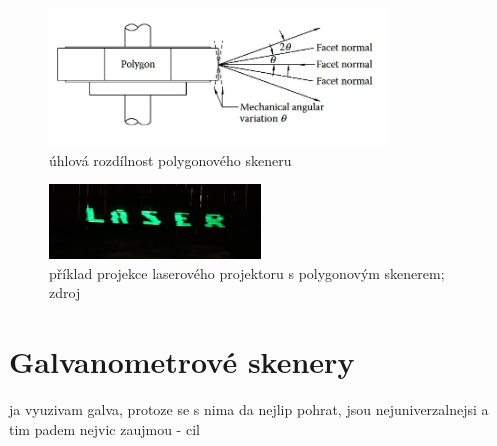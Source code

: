 \begin{figure}[!htb]
  \centering
  \includegraphics[width=0.8\textwidth]{img/polygon-angular-variation.jpg}
  \caption{\label{fig:polygon-angular-variation} úhlová rozdílnost polygonového skeneru}
\end{figure}


\begin{figure}[!htb]
  \centering
  \includegraphics[width=0.5\textwidth]{img/harddrive-projection.jpg}
  \caption{\label{fig:harddrive-projection} příklad projekce laserového projektoru s polygonovým skenerem; zdroj \cite{harddrive-projector-youtube}}
\end{figure}

\section{Galvanometrové skenery}

ja vyuzivam galva, protoze se s nima da nejlip pohrat, jsou nejuniverzalnejsi a tim padem nejvic zaujmou - cil